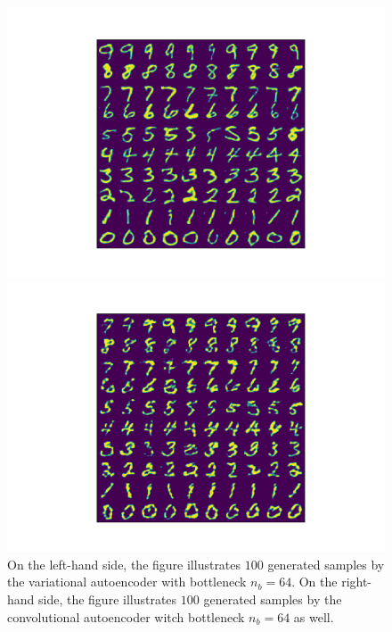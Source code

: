 \begin{figure}
\begin{center}
\begin{minipage}[b]{0.49\linewidth}
      \includegraphics[trim = 15mm 10mm 15mm 10mm, clip, width=\linewidth]{convolutional_VAE_snd_KL_4e-5_10k_epochs_64D_generated}
	\end{minipage}
   \begin{minipage}[b]{0.49\linewidth}
      \includegraphics[trim = 15mm 10mm 15mm 10mm, clip, width=\linewidth]{convolutional_AE_generated}
	\end{minipage}
\end{center}
\caption{On the left-hand side, the figure illustrates $100$ generated samples by the variational autoencoder with bottleneck $n_b=64$. On the right-hand side, the figure illustrates $100$ generated samples by the convolutional autoencoder witch bottleneck $n_b=64$ as well.}\label{fig:convolutional_VAE_vs_convolutional_AE}
\end{figure}

